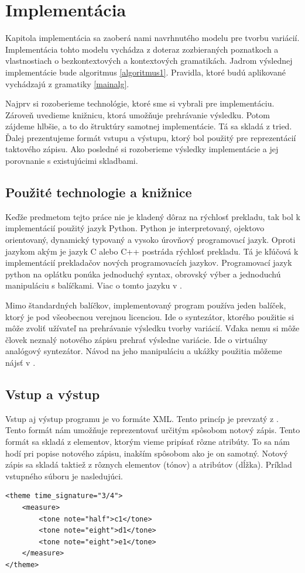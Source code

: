 \chapter{Implementácia}
\label{chap:imp}
Kapitola implementácia sa zaoberá nami navrhnutého modelu pre tvorbu variácií. Implementácia tohto modelu vychádza z doteraz zozbieraných poznatkoch a vlastnostiach o bezkontextových a kontextových gramatikách. Jadrom výslednej implementácie bude algoritmus \ref{algoritmus1}. Pravidla, ktoré budú aplikované vychádzajú z gramatiky \ref{mainalg}.

Najprv si rozoberieme technológie, ktoré sme si vybrali pre implementáciu. Zároveň uvedieme knižnicu, ktorá umožňuje prehrávanie výsledku. Potom zájdeme hlbšie, a to do štruktúry samotnej implementácie. Tá sa skladá z tried. Ďalej prezentujeme formát vstupu a výstupu, ktorý bol použitý pre reprezentácií taktového zápisu. Ako posledné si rozoberieme výsledky implementácie a jej porovnanie s existujúcimi skladbami.

\section{Použité technologie a knižnice}
\label{technologies}
Keďže predmetom tejto práce nie je kladený dôraz na rýchlosť prekladu, tak bol k implementácií použitý jazyk Python. Python je interpretovaný, ojektovo orientovaný, dynamický typovaný a vysoko úrovňový programovací jazyk. Oproti jazykom akým je jazyk C alebo C++ postráda rýchlosť prekladu. Tá je kľúčová k implementácií prekladačov nových programovacích jazykov. Programovací jazyk python na oplátku ponúka jednoduchý syntax, obrovský výber a jednoduchú manipuláciu s balíčkami. Viac o tomto jazyku v \cite{python:site}.

Mimo štandardných balíčkov, implementovaný program používa jeden balíček, ktorý je pod všeobecnou verejnou licenciou. Ide o syntezátor, ktorého použitie si môže zvoliť užívateľ na prehrávanie výsledku tvorby variácií. Vďaka nemu si môže človek neznalý notového zápisu prehrať výsledne variácie. Ide o virtuálny analógový syntezátor. Návod na jeho manipuláciu a ukážky použitia môžeme nájsť v \cite{synt:site}.

\section{Vstup a výstup}
\label{inputoutput}
Vstup aj výstup programu je vo formáte XML. Tento princíp je prevzatý z \cite{afrpub}. Tento formát nám umožňuje reprezentovať určitým spôsobom notový zápis. Tento formát sa skladá z elementov, ktorým vieme pripísať rôzne atribúty. To sa nám hodí pri popise notového zápisu, inakším spôsobom ako je on samotný. Notový zápis sa skladá taktiež z rôznych elementov (tónov) a atribútov (dĺžka). Príklad vstupného súboru je nasledujúci.
\lstset{language=XML}
\begin{lstlisting}
<theme time_signature="3/4">
    <measure>
        <tone note="half">c1</tone>
        <tone note="eight">d1</tone>
        <tone note="eight">e1</tone>
    </measure>
</theme>
\end{lstlisting}

